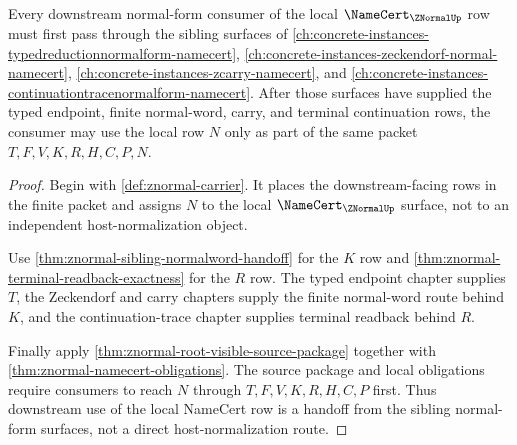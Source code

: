 \begin{theorem}
\label{thm:znormal-root-obligation-downstream-handoff}
Every downstream normal-form consumer of the local $\NameCert_{\ZNormalUp}$ row must first pass through the sibling surfaces of \autoref{ch:concrete-instances-typedreductionnormalform-namecert}, \autoref{ch:concrete-instances-zeckendorf-normal-namecert}, \autoref{ch:concrete-instances-zcarry-namecert}, and \autoref{ch:concrete-instances-continuationtracenormalform-namecert}. After those surfaces have supplied the typed endpoint, finite normal-word, carry, and terminal continuation rows, the consumer may use the local row $N$ only as part of the same packet $T,F,V,K,R,H,C,P,N$.
\end{theorem}
\begin{proof}
Begin with \autoref{def:znormal-carrier}. It places the downstream-facing rows in the finite packet and assigns $N$ to the local $\NameCert_{\ZNormalUp}$ surface, not to an independent host-normalization object.

Use \autoref{thm:znormal-sibling-normalword-handoff} for the $K$ row and \autoref{thm:znormal-terminal-readback-exactness} for the $R$ row. The typed endpoint chapter supplies $T$, the Zeckendorf and carry chapters supply the finite normal-word route behind $K$, and the continuation-trace chapter supplies terminal readback behind $R$.

Finally apply \autoref{thm:znormal-root-visible-source-package} together with \autoref{thm:znormal-namecert-obligations}. The source package and local obligations require consumers to reach $N$ through $T,F,V,K,R,H,C,P$ first. Thus downstream use of the local NameCert row is a handoff from the sibling normal-form surfaces, not a direct host-normalization route.
\end{proof}
